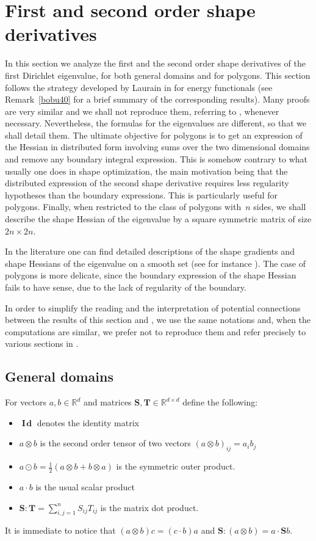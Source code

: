 \documentclass[11pt]{article}
\numberwithin{equation}{section}\newtheorem*{jepEnonce}{\jepEnonceTitle}\newenvironment{enonce*}[1]{\def\jepEnonceTitle{#1}\jepEnonce}{\endjepEnonce}\newtheorem*{conj*}{Conjecture}
\theoremstyle{plain}
\theoremstyle{definition}
\newcommand{\bo}[1]{{\boldsymbol#1}}
\newcommand{\Id}{\operatorname{{\bo I\!\bo d}}}
\let\Bbb\mathbb
\begin{document}
\section{First and second order shape derivatives}\label{bobu200.s2}
In this section we analyze the first and the second order shape derivatives of the first Dirichlet eigenvalue, for both general domains and for polygons. This section follows the strategy developed by Laurain in \cite{laurain2ndDeriv} for energy functionals (see Remark~\ref{bobu40} for a brief summary of the corresponding results). Many proofs are very similar and we shall not reproduce them, referring to \cite{laurain2ndDeriv}, whenever necessary. Nevertheless, the formulas for the eigenvalues are different, so that we shall detail them. The ultimate objective for polygons is to get an expression of the Hessian in distributed form involving sums over the two dimensional domains and remove any boundary integral expression. This is somehow contrary to what usually one does in shape optimization, the main motivation being that the distributed expression of the second shape derivative requires less regularity hypotheses than the boundary expressions. This is particularly useful for polygons. Finally, when restricted to the class of polygons with~$n$ sides, we shall describe the shape Hessian of the eigenvalue by a square symmetric matrix of size $2n\times 2n$.

In the literature one can find detailed descriptions of the shape gradients and shape Hessians of the eigenvalue on a smooth set (see for instance \cite{henrot-pierre-english, HPR04, LNM16,DL19}). The case of polygons is more delicate, since the boundary expression of the shape Hessian fails to have sense, due to the lack of regularity of the boundary.

In order to simplify the reading and the interpretation of potential connections between the results of this section and \cite{laurain2ndDeriv}, we use the same notations and, when the computations are similar, we prefer not to reproduce them and refer precisely to various sections in \cite{laurain2ndDeriv}.
\subsection{General domains}
For vectors $a,b \in \Bbb{R}^d$ and matrices $\bo S, \bo T\in \Bbb{R}^{d\times d}$ define the following:
\begin{itemize}
\item $\Id$ denotes the identity matrix
\item $a \otimes b$ is the second order tensor of two vectors $(a\otimes b)_{ij} = a_ib_j$
\item $a\odot b = \frac{1}{2} (a\otimes b+b\otimes a)$ is the symmetric outer product.
\item $a \cdot b$ is the usual scalar product
\item $\bo S : \bo T = \sum_{i,j=1}^n S_{ij}T_{ij}$ is the matrix dot product.
\end{itemize}
It is immediate to notice that $(a\otimes b)c = (c\cdot b)a$ and $\bo S: (a\otimes b) = a \cdot \bo S b$.
\end{document}
